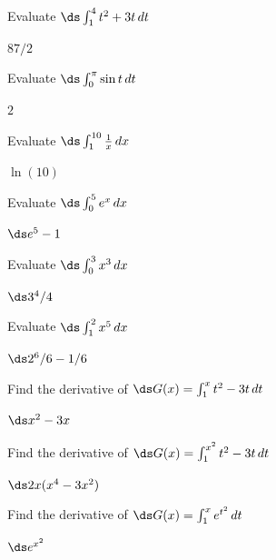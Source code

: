 \begin{enumialphparenastyle}

\begin{ex}
Evaluate $\ds \int_1^4 t^2+3t\,dt$
\begin{sol}
 $87/2$
\end{sol}
\end{ex}

\begin{ex}
Evaluate $\ds \int_0^\pi \sin t\,dt$
\begin{sol}
 $2$
\end{sol}
\end{ex}

\begin{ex}
Evaluate $\ds \int_1^{10} {1\over x}\,dx$
\begin{sol}
 $\ln(10)$
\end{sol}
\end{ex}

\begin{ex}
Evaluate $\ds \int_0^5 e^x\,dx$
\begin{sol}
 $\ds e^5-1$
\end{sol}
\end{ex}

\begin{ex}
Evaluate $\ds \int_0^3 x^3\,dx$
\begin{sol}
 $\ds 3^4/4$
\end{sol}
\end{ex}

\begin{ex}
Evaluate $\ds \int_1^2 x^5\,dx$
\begin{sol}
 $\ds 2^6/6 -1/6$
\end{sol}
\end{ex}

\begin{ex}
 Find the derivative of $\ds G(x)=\int_1^x t^2-3t\,dt$
\begin{sol}
 $\ds x^2-3x$
\end{sol}
\end{ex}

\begin{ex}
 Find the derivative of $\ds G(x)=\int_1^{x^2} t^2-3t\,dt$
\begin{sol}
 $\ds 2x(x^4-3x^2)$
\end{sol}
\end{ex}

\begin{ex}
 Find the derivative of $\ds G(x)=\int_1^x e^{t^2}\,dt$
\begin{sol}
 $\ds e^{x^2}$
\end{sol}
\end{ex}


\end{enumialphparenastyle}
